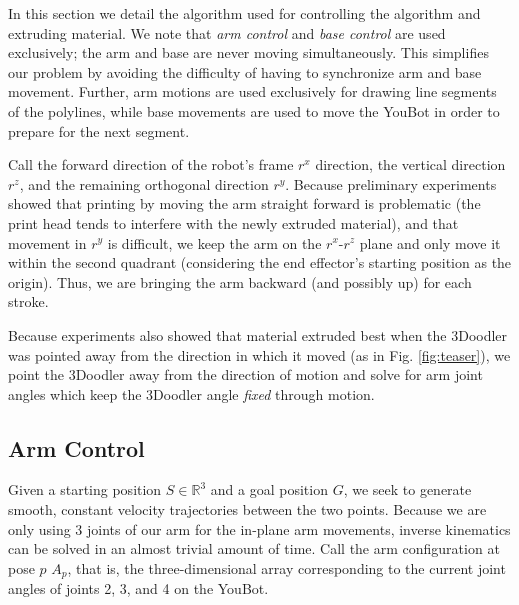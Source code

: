 \documentclass[conference]{acmsiggraph}
\begin{document}
In this section we detail the algorithm used for controlling the algorithm and extruding material.  We note that \emph{arm control} and \emph{base control} are used exclusively; the arm and base are never moving simultaneously.  This simplifies our problem by avoiding the difficulty of having to synchronize arm and base movement.  Further, arm motions are used exclusively for drawing line segments of the polylines, while base movements are used to move the YouBot in order to prepare for the next segment.  

Call the forward direction of the robot's frame $r^x$ direction, the vertical direction $r^z$, and the remaining orthogonal direction $r^y$.  Because preliminary experiments showed that printing by moving the arm straight forward is problematic (the print head tends to interfere with the newly extruded material), and that movement in $r^y$ is difficult, we keep the arm on the $r^x$-$r^z$ plane and only move it within the second quadrant (considering the end effector's starting position as the origin).  Thus, we are bringing the arm backward (and possibly up) for each stroke.

Because experiments also showed that material extruded best when the 3Doodler was pointed away from the direction in which it moved (as in Fig. \ref{fig:teaser}), we point the 3Doodler away from the direction of motion and solve for arm joint angles which keep the 3Doodler angle \emph{fixed} through motion.

\subsection{Arm Control}
Given a starting position $S \in \mathbb{R}^3$ and a goal position $G$, we seek to generate smooth, constant velocity trajectories between the two points.  Because we are only using 3 joints of our arm for the in-plane arm movements, inverse kinematics can be solved in an almost trivial amount of time.  Call the arm configuration at pose $p$ $A_p$, that is, the three-dimensional array corresponding to the current joint angles of joints 2, 3, and 4 on the YouBot.
\end{document}
